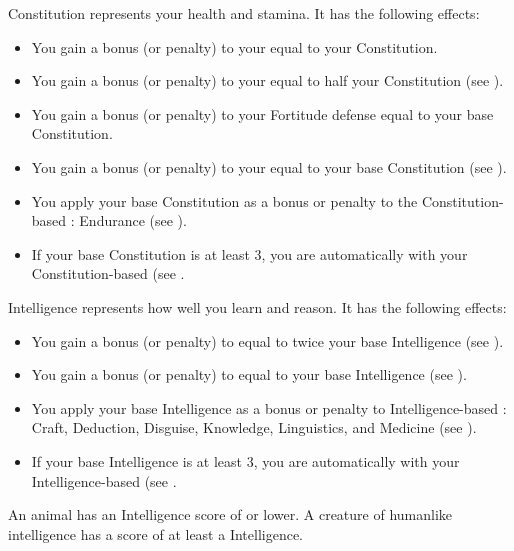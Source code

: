         \label{Constitution}
        {
            Constitution represents your health and stamina.
            It has the following effects:
            \begin{itemize}
                \item You gain a bonus (or penalty) to your  equal to your Constitution.
                \item You gain a bonus (or penalty) to your  equal to half your Constitution (see ).
                \item You gain a bonus (or penalty) to your Fortitude defense equal to your base Constitution.
                \item You gain a bonus (or penalty) to your  equal to your base Constitution (see ).
                \item You apply your base Constitution as a bonus or penalty to the Constitution-based : Endurance (see ).
                \item If your base Constitution is at least 3, you are automatically  with your Constitution-based  (see .
            \end{itemize}
        }

        \label{Intelligence}
        {
            Intelligence represents how well you learn and reason.
            It has the following effects:

            \begin{itemize}
                \item You gain a bonus (or penalty) to  equal to twice your base Intelligence (see ).
                \item You gain a bonus (or penalty) to  equal to your base Intelligence (see ).
                \item You apply your base Intelligence as a bonus or penalty to Intelligence-based : Craft, Deduction, Disguise, Knowledge, Linguistics, and Medicine (see ).
                \item If your base Intelligence is at least 3, you are automatically  with your Intelligence-based  (see .
            \end{itemize}

            \par An animal has an Intelligence score of  or lower.
            A creature of humanlike intelligence has a score of at least a  Intelligence.
        }

